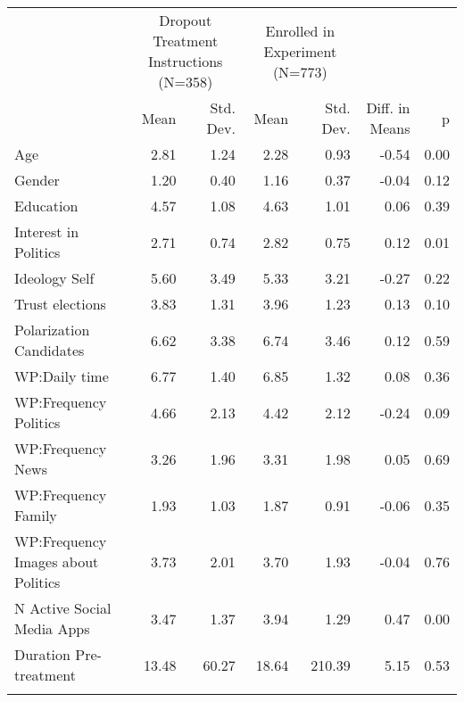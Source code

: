 \begin{table}

\caption{}
\centering
\begin{tabular}[t]{lrrrrrr}
\toprule
\multicolumn{1}{c}{ } & \multicolumn{2}{c}{Dropout Treatment Instructions (N=358)} & \multicolumn{2}{c}{Enrolled in Experiment (N=773)} & \multicolumn{2}{c}{ } \\
\cmidrule(l{3pt}r{3pt}){2-3} \cmidrule(l{3pt}r{3pt}){4-5}
  & Mean & Std. Dev. & Mean & Std. Dev. & Diff. in Means & p\\
\midrule
Age & 2.81 & 1.24 & 2.28 & 0.93 & -0.54 & 0.00\\
Gender & 1.20 & 0.40 & 1.16 & 0.37 & -0.04 & 0.12\\
Education & 4.57 & 1.08 & 4.63 & 1.01 & 0.06 & 0.39\\
Interest in Politics & 2.71 & 0.74 & 2.82 & 0.75 & 0.12 & 0.01\\
Ideology Self & 5.60 & 3.49 & 5.33 & 3.21 & -0.27 & 0.22\\
Trust elections & 3.83 & 1.31 & 3.96 & 1.23 & 0.13 & 0.10\\
Polarization Candidates & 6.62 & 3.38 & 6.74 & 3.46 & 0.12 & 0.59\\
WP:Daily time & 6.77 & 1.40 & 6.85 & 1.32 & 0.08 & 0.36\\
WP:Frequency Politics & 4.66 & 2.13 & 4.42 & 2.12 & -0.24 & 0.09\\
WP:Frequency News & 3.26 & 1.96 & 3.31 & 1.98 & 0.05 & 0.69\\
WP:Frequency Family & 1.93 & 1.03 & 1.87 & 0.91 & -0.06 & 0.35\\
WP:Frequency Images about Politics & 3.73 & 2.01 & 3.70 & 1.93 & -0.04 & 0.76\\
N Active Social Media Apps & 3.47 & 1.37 & 3.94 & 1.29 & 0.47 & 0.00\\
Duration Pre-treatment & 13.48 & 60.27 & 18.64 & 210.39 & 5.15 & 0.53\\
\bottomrule
\multicolumn{7}{l}{\rule{0pt}{1em}}\\
\end{tabular}
\end{table}

